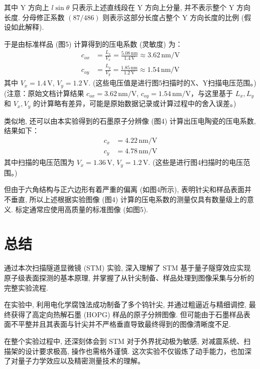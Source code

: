\documentclass{whureport}
\begin{document}
\begin{multicols}{2}
其中 Y 方向上 \( l \sin \theta \) 只表示上述直线段在 Y 方向上分量, 并不表示整个 Y 方向长度. 分母修正系数 \( (87/486) \) 则表示这部分长度占整个 Y 方向长度的比例 (假设如此解释).

于是由标准样品 (图5) 计算得到的压电系数 (灵敏度) 为：
\begin{align}
 c_{ox} &= \frac{L_x}{V_x} = \frac{5.08 \, \text{nm}}{1.4 \, \text{V}} \approx 3.62 \, \text{nm/V} \label{eq:cox} \\ %
 c_{oy} &= \frac{L_y}{V_y} = \frac{1.85 \, \text{nm}}{1.2 \, \text{V}} \approx 1.54 \, \text{nm/V} \label{eq:coy} %
\end{align}
其中 \( V_x = 1.4 \, \text{V} \), \( V_y = 1.2 \, \text{V} \). (这些电压值是进行图5扫描时的X、Y扫描电压范围。) (注意：原始文档计算结果 \(c_{ox}=3.62\,\text{nm/V}\), \(c_{oy}=1.54\,\text{nm/V}\)，与这里基于 \(L_x, L_y\) 和 \(V_x, V_y\) 的计算略有差异，可能是原始数据记录或计算过程中的舍入误差。)

类似地, 还可以由本实验得到的石墨原子分辨像 (图4) 计算出压电陶瓷的压电系数, 结果如下：
\begin{align} %
 c_x &= 4.22 \, \text{nm/V} \label{eq:cx_exp} \\
 c_y &= 4.78 \, \text{nm/V} \label{eq:cy_exp}
\end{align}
其中扫描的电压范围为 \( V_x = 1.36 \, \text{V} \), \( V_y = 1.2 \, \text{V} \). (这些是进行图4扫描时的电压范围。)

但由于六角结构与正六边形有着严重的偏离 (如图4所示), 表明针尖和样品表面并不垂直, 所以上述根据实验图像 (图4) 计算的压电系数的测量仅具有数量级上的意义. 标定通常应使用高质量的标准图像 (如图5).

\section{总结}
通过本次扫描隧道显微镜 (STM) 实验, 深入理解了 STM 基于量子隧穿效应实现原子级表面探测的基本原理, 并掌握了从针尖制备、样品处理到图像采集与分析的完整实验流程.

在实验中, 利用电化学腐蚀法成功制备了多个钨针尖, 并通过粗逼近与精细调控, 最终获得了高定向热解石墨 (HOPG) 样品的原子分辨图像. 但可能由于石墨样品表面不平整并且其表面与针尖并不严格垂直导致最终得到的图像清晰度不足.

在整个实验过程中, 还深刻体会到 STM 对于外界扰动极为敏感, 对减震系统、扫描架的设计要求极高, 操作也需格外谨慎. 这次实验不仅锻炼了动手能力，也加深了对量子力学效应以及精密测量技术的理解。

\end{multicols}
\end{document}
